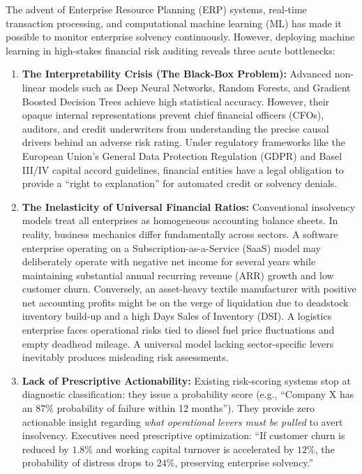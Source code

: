 \documentclass[11pt, a4paper]{article}
\begin{document}
The advent of Enterprise Resource Planning (ERP) systems, real-time transaction processing, and computational machine learning (ML) has made it possible to monitor enterprise solvency continuously. However, deploying machine learning in high-stakes financial risk auditing reveals three acute bottlenecks:
\begin{enumerate}
    \item \textbf{The Interpretability Crisis (The Black-Box Problem):} Advanced non-linear models such as Deep Neural Networks, Random Forests, and Gradient Boosted Decision Trees achieve high statistical accuracy. However, their opaque internal representations prevent chief financial officers (CFOs), auditors, and credit underwriters from understanding the precise causal drivers behind an adverse risk rating. Under regulatory frameworks like the European Union's General Data Protection Regulation (GDPR) and Basel III/IV capital accord guidelines, financial entities have a legal obligation to provide a ``right to explanation'' for automated credit or solvency denials.
    \item \textbf{The Inelasticity of Universal Financial Ratios:} Conventional insolvency models treat all enterprises as homogeneous accounting balance sheets. In reality, business mechanics differ fundamentally across sectors. A software enterprise operating on a Subscription-as-a-Service (SaaS) model may deliberately operate with negative net income for several years while maintaining substantial annual recurring revenue (ARR) growth and low customer churn. Conversely, an asset-heavy textile manufacturer with positive net accounting profits might be on the verge of liquidation due to deadstock inventory build-up and a high Days Sales of Inventory (DSI). A logistics enterprise faces operational risks tied to diesel fuel price fluctuations and empty deadhead mileage. A universal model lacking sector-specific levers inevitably produces misleading risk assessments.
    \item \textbf{Lack of Prescriptive Actionability:} Existing risk-scoring systems stop at diagnostic classification: they issue a probability score (e.g., ``Company X has an $87\%$ probability of failure within 12 months''). They provide zero actionable insight regarding \textit{what operational levers must be pulled} to avert insolvency. Executives need prescriptive optimization: ``If customer churn is reduced by $1.8\%$ and working capital turnover is accelerated by $12\%$, the probability of distress drops to $24\%$, preserving enterprise solvency.''
\end{enumerate}
\end{document}
